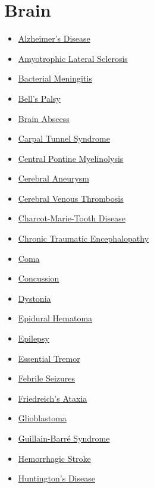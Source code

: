 \section*{Brain}
\label{sec:organ_brain}
\begin{itemize}[noitemsep]
  \item \hyperlink{sec:Alzheimer's Disease}{Alzheimer's Disease}
  \item \hyperlink{sec:Amyotrophic Lateral Sclerosis}{Amyotrophic Lateral Sclerosis}
  \item \hyperlink{sec:Bacterial Meningitis}{Bacterial Meningitis}
  \item \hyperlink{sec:Bell's Palsy}{Bell's Palsy}
  \item \hyperlink{sec:Brain Abscess}{Brain Abscess}
  \item \hyperlink{sec:Carpal Tunnel Syndrome}{Carpal Tunnel Syndrome}
  \item \hyperlink{sec:Central Pontine Myelinolysis}{Central Pontine Myelinolysis}
  \item \hyperlink{sec:Cerebral Aneurysm}{Cerebral Aneurysm}
  \item \hyperlink{sec:Cerebral Venous Thrombosis}{Cerebral Venous Thrombosis}
  \item \hyperlink{sec:Charcot-Marie-Tooth Disease}{Charcot-Marie-Tooth Disease}
  \item \hyperlink{sec:Chronic Traumatic Encephalopathy}{Chronic Traumatic Encephalopathy}
  \item \hyperlink{sec:Coma}{Coma}
  \item \hyperlink{sec:Concussion}{Concussion}
  \item \hyperlink{sec:Dystonia}{Dystonia}
  \item \hyperlink{sec:Epidural Hematoma}{Epidural Hematoma}
  \item \hyperlink{sec:Epilepsy}{Epilepsy}
  \item \hyperlink{sec:Essential Tremor}{Essential Tremor}
  \item \hyperlink{sec:Febrile Seizures}{Febrile Seizures}
  \item \hyperlink{sec:Friedreich's Ataxia}{Friedreich's Ataxia}
  \item \hyperlink{sec:Glioblastoma}{Glioblastoma}
  \item \hyperlink{sec:Guillain-Barré Syndrome}{Guillain-Barr\'{e} Syndrome}
  \item \hyperlink{sec:Hemorrhagic Stroke}{Hemorrhagic Stroke}
  \item \hyperlink{sec:Huntington's Disease}{Huntington's Disease}

\end{itemize}
